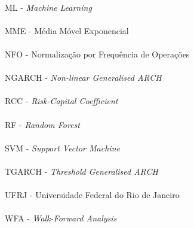 \paragraph{}ML - \textit{Machine Learning}
\paragraph{}MME - Média Móvel Exponencial
\paragraph{}NFO - Normalização por Frequência de Operações
\paragraph{}NGARCH - \textit{Non-linear Generalised ARCH}
\paragraph{}RCC - \textit{Risk-Capital Coefficient}
\paragraph{}RF - \textit{Random Forest}
\paragraph{}SVM - \textit{Support Vector Machine}
\paragraph{}TGARCH - \textit{Threshold Generalised ARCH}
\paragraph{}UFRJ - Universidade Federal do Rio de Janeiro
\paragraph{}WFA - \textit{Walk-Forward Analysis}

\pagebreak